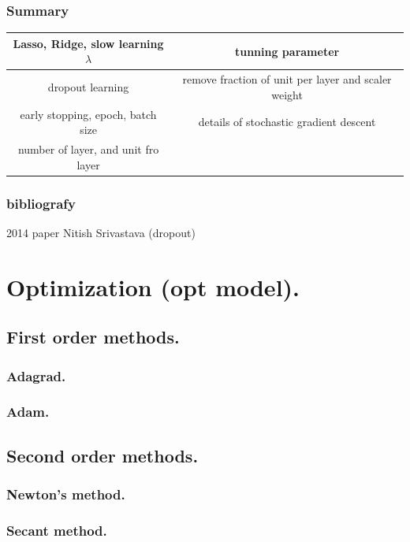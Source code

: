 \documentclass[12pt, a4paper]{book}
\begin{document}
\section{Summary} 
\begin{table}[H]
	\centering
	\begin{tabular}{|c|c|}
		\hline
		Lasso, Ridge, slow learning $\lambda$ & tunning parameter\\
		\hline
		dropout learning & remove fraction of unit per layer and scaler weight\\
		\hline
		early stopping, epoch, batch size& details of stochastic gradient descent\\
		\hline 
		number of layer, and unit fro layer& \\
		\hline 
	\end{tabular}
\end{table}

\section{bibliografy}
2014 paper Nitish Srivastava (dropout)\\



\part{Optimization (opt model).}
\chapter{First order methods.}
\section{Adagrad.}
\section{Adam.}

\chapter{Second order methods.}
\section{Newton's method.}
\section{Secant method.}
\end{document}
